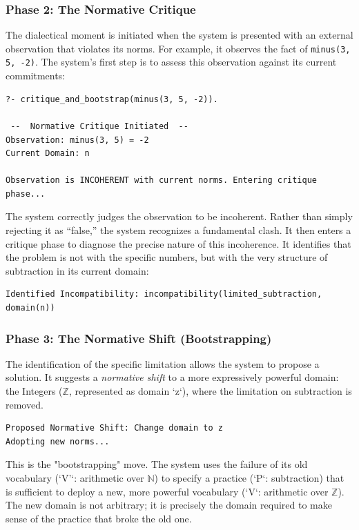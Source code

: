 \documentclass[12pt]{book}
\begin{document}
\subsubsection{Phase 2: The Normative Critique}
The dialectical moment is initiated when the system is presented with an external observation that violates its norms. For example, it observes the fact of \texttt{minus(3, 5, -2)}. The system's first step is to assess this observation against its current commitments:
\begin{verbatim}
?- critique_and_bootstrap(minus(3, 5, -2)).

 --  Normative Critique Initiated  -- 
Observation: minus(3, 5) = -2
Current Domain: n

Observation is INCOHERENT with current norms. Entering critique phase...
\end{verbatim}
The system correctly judges the observation to be incoherent. Rather than simply rejecting it as ``false,'' the system recognizes a fundamental clash. It then enters a critique phase to diagnose the precise nature of this incoherence. It identifies that the problem is not with the specific numbers, but with the very structure of subtraction in its current domain:
\begin{verbatim}
Identified Incompatibility: incompatibility(limited_subtraction, domain(n))
\end{verbatim}

\subsubsection{Phase 3: The Normative Shift (Bootstrapping)}
The identification of the specific limitation allows the system to propose a solution. It suggests a \textit{normative shift} to a more expressively powerful domain: the Integers ($\mathbb{Z}$, represented as domain `z`), where the limitation on subtraction is removed.
\begin{verbatim}
Proposed Normative Shift: Change domain to z
Adopting new norms...
\end{verbatim}
This is the "bootstrapping" move. The system uses the failure of its old vocabulary (`V'`: arithmetic over $\mathbb{N}$) to specify a practice (`P`: subtraction) that is sufficient to deploy a new, more powerful vocabulary (`V`: arithmetic over $\mathbb{Z}$). The new domain is not arbitrary; it is precisely the domain required to make sense of the practice that broke the old one.
\end{document}
